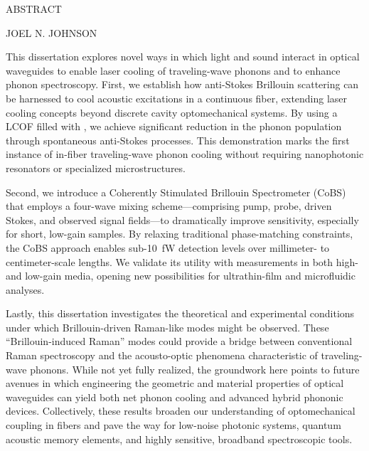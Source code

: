 {}

\begin{center}
    \large
    ABSTRACT

    \large
    \dissertationTitle{}

    \large
    \vspace{2mm}
    JOEL N. JOHNSON

\end{center}

\noindent

This dissertation explores novel ways in which light and sound interact in optical waveguides to enable laser cooling of traveling-wave phonons and to enhance phonon spectroscopy. First, we establish how anti-Stokes Brillouin scattering can be harnessed to cool acoustic excitations in a continuous fiber, extending laser cooling concepts beyond discrete cavity optomechanical systems. By using a \ac{LCOF} filled with , we achieve significant reduction in the phonon population through spontaneous anti-Stokes processes. This demonstration marks the first instance of in-fiber traveling-wave phonon cooling without requiring nanophotonic resonators or specialized microstructures.

Second, we introduce a Coherently Stimulated Brillouin Spectrometer (\acs{CoBS}) that employs a four-wave mixing scheme—comprising pump, probe, driven Stokes, and observed signal fields—to dramatically improve sensitivity, especially for short, low-gain samples. By relaxing traditional phase-matching constraints, the CoBS approach enables sub-\SI{10}{\femto\watt} detection levels over millimeter- to centimeter-scale lengths. We validate its utility with measurements in both high- and low-gain media, opening new possibilities for ultrathin-film and microfluidic analyses.

Lastly, this dissertation investigates the theoretical and experimental conditions under which Brillouin-driven Raman-like modes might be observed. These “Brillouin-induced Raman” modes could provide a bridge between conventional Raman spectroscopy and the acousto-optic phenomena characteristic of traveling-wave phonons. While not yet fully realized, the groundwork here points to future avenues in which engineering the geometric and material properties of optical waveguides can yield both net phonon cooling and advanced hybrid phononic devices. Collectively, these results broaden our understanding of optomechanical coupling in fibers and pave the way for low-noise photonic systems, quantum acoustic memory elements, and highly sensitive, broadband spectroscopic tools.
